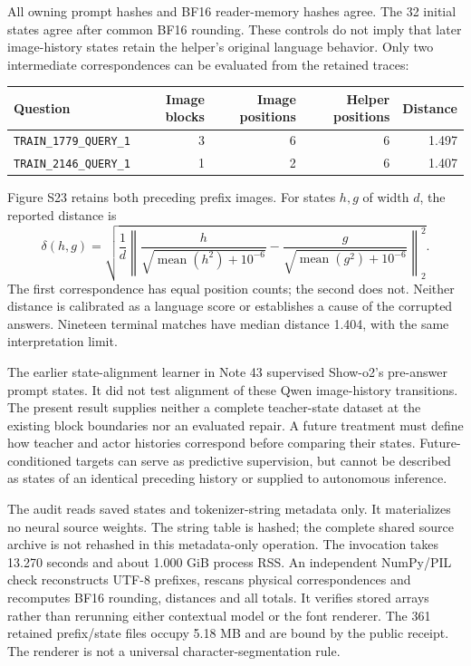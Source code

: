 All owning prompt hashes and BF16 reader-memory hashes agree. The 32 initial
states agree after common BF16 rounding. These controls do not imply that
later image-history states retain the helper's original language behavior.
Only two intermediate correspondences can be evaluated from the retained
traces:
\begin{center}\small
\begin{tabular}{lrrrr}
\toprule
Question & Image blocks & Image positions & Helper positions & Distance\\
\midrule
\texttt{TRAIN\_1779\_QUERY\_1} & 3 & 6 & 6 & 1.497\\
\texttt{TRAIN\_2146\_QUERY\_1} & 1 & 2 & 6 & 1.407\\
\bottomrule
\end{tabular}
\end{center}
Figure S23 retains both preceding prefix images. For states $h,g$ of width
$d$, the reported distance is
\[
 \delta(h,g)=
 \sqrt{\frac{1}{d}\left\|
 \frac{h}{\sqrt{\operatorname{mean}(h^2)+10^{-6}}}
 -
 \frac{g}{\sqrt{\operatorname{mean}(g^2)+10^{-6}}}
 \right\|_2^2}.
\]
The first correspondence has equal position counts; the second does not.
Neither distance is calibrated as a language score or establishes a cause
of the corrupted answers. Nineteen terminal matches have median distance
1.404, with the same interpretation limit.

The earlier state-alignment learner in Note 43 supervised Show-o2's
pre-answer prompt states. It did not test alignment of these Qwen
image-history transitions. The present result supplies neither a complete
teacher-state dataset at the existing block boundaries nor an evaluated
repair. A future treatment must define how teacher and actor histories
correspond before comparing their states. Future-conditioned targets can
serve as predictive supervision, but cannot be described as states of an
identical preceding history or supplied to autonomous inference.

The audit reads saved states and tokenizer-string metadata only. It
materializes no neural source weights. The string table is hashed; the
complete shared source archive is not rehashed in this metadata-only
operation. The invocation takes 13.270 seconds and about 1.000 GiB process
RSS. An independent NumPy/PIL check reconstructs UTF-8 prefixes, rescans
physical correspondences and recomputes BF16 rounding, distances and all
totals. It verifies stored arrays rather than rerunning either contextual
model or the font renderer. The 361 retained prefix/state files occupy
5.18 MB and are bound by the public receipt. The renderer is not a universal
character-segmentation rule.

